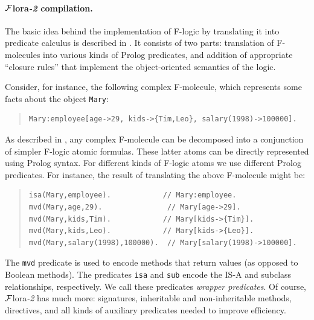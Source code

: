\documentclass[11pt]{article}
\newcommand{\FLORA}{{\mbox{\sc ${\cal F}${lora}\rm\emph{-2}}}\xspace}
\newcommand{\fl}{\mbox{F-logic}\xspace}
\begin{document}
\paragraph{\FLORA compilation.}
The basic idea behind the implementation of \fl by translating it into
predicate calculus is described in \cite{KLW95}. It consists of two parts:
translation of F-molecules into various kinds of Prolog predicates, and
addition of appropriate ``closure rules'' that implement the
object-oriented semantics of the logic.

Consider, for instance, the following complex F-molecule, which represents
some facts about the object \texttt{Mary}:

\begin{quote}
\begin{verbatim}
Mary:employee[age->29, kids->{Tim,Leo}, salary(1998)->100000].
\end{verbatim}
\end{quote}

As described in \cite{KLW95}, any complex F-molecule can be
decomposed into a conjunction of simpler \fl atomic formulas. These
latter atoms can be directly represented using Prolog syntax.  For
different kinds of \fl atoms we use different Prolog predicates. For
instance, the result of translating the above F-molecule might be:

\begin{quote}
\begin{verbatim}
isa(Mary,employee).            // Mary:employee.
mvd(Mary,age,29).               // Mary[age->29].
mvd(Mary,kids,Tim).            // Mary[kids->{Tim}].
mvd(Mary,kids,Leo).            // Mary[kids->{Leo}].
mvd(Mary,salary(1998),100000).  // Mary[salary(1998)->100000].
\end{verbatim}
\end{quote}

The {\tt mvd} predicate is used to encode methods that return values (as
opposed to Boolean methods).
The predicates {\tt isa} and {\tt sub}
encode the IS-A and subclass relationships, respectively.
We call these predicates \emph{wrapper predicates}. 
Of course, \FLORA has much more: signatures, inheritable and
non-inheritable methods, directives, and all kinds of auxiliary predicates
needed to improve efficiency.
\end{document}
